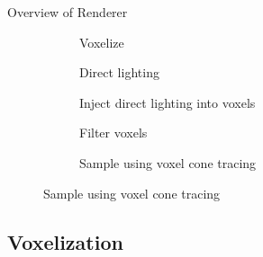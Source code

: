 \documentclass[10pt]{beamer}
\begin{document}
\begin{frame}{Overview of Renderer}
  \captionsetup[subfigure]{font=footnotesize,labelfont=footnotesize}
  \begin{figure}
    \renewcommand{\thesubfigure}{\arabic{subfigure}}
    \begin{subfigure}[t]{0.32\textwidth}
      \caption{Voxelize}
    \end{subfigure}
    \begin{subfigure}[t]{0.32\textwidth}
      \caption{Direct lighting}
    \end{subfigure}
    \begin{subfigure}[t]{0.32\textwidth}
      \caption{Inject direct lighting into voxels}
    \end{subfigure}

    \begin{subfigure}[t]{0.32\textwidth}
      \caption{Filter voxels}
    \end{subfigure}
    \begin{subfigure}[t]{0.32\textwidth}
      \caption{Sample using voxel cone tracing}
    \end{subfigure}
  \end{figure}
\end{frame}


\subsection{Voxelization}
\end{document}
